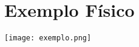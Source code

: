 \documentclass[a4paper,12pt,oneside]{book}
\begin{document}
\setlength{\parskip}{1pt}
\chapter{Exemplo Físico}

\begin{center}

    \texttt{[image: exemplo.png]}

\end{center}

% 
% 
% 
% 
% 
% 
% 
\end{document}
